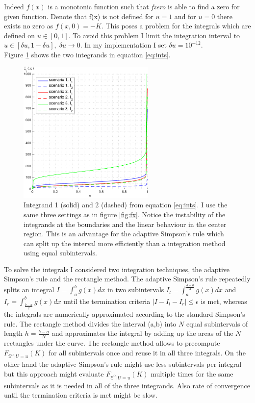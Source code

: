 \documentclass[a4paper]{article}
\begin{document}
Indeed $f(x)$ is a monotonic function such that \textit{fzero} is able to find a zero for given function. Denote that f(x) is not defined for $u=1$ and for $u=0$ there exists no zero as $f(x,0)=-K$. This poses a problem for the integrals which are defined on $u\in[0,1]$. To avoid this problem I limit the integration interval to $u\in[\delta u,1-\delta u],\; \delta u \rightarrow 0.$ In my implementation I set $\delta u = 10^{-12}.$ \\
Figure \ref{fig:ints} shows the two integrands in equation \ref{eq:ints}. 
\begin{figure}[h!]
	\centering
	\captionsetup{width=.6\linewidth}
	\includegraphics[width=0.6\textwidth]{graphics/ints_noTitle.pdf}
	\caption{Integrand 1 (solid) and 2 (dashed) from equation \ref{eq:ints}. I use the same three settings as in figure \ref{fig:fx}. Notice the instability of the integrands at the boundaries and the linear behaviour in the center region. This is an advantage for the adaptive Simpson's rule which can split up the interval more efficiently than a integration method using equal subintervals. }
	\label{fig:ints}
\end{figure}
To solve the integrals I considered two integration techniques, the adaptive Simpson's rule and the rectangle method. The adaptive Simpson's rule repeatedly splits an integral $I = \int_a^b g(x) dx$ in two subintervals $ I_l = \int_a^{\frac{b-a}{2}} g(x) dx$ and $I_r = \int_{\frac{b-a}{2}}^b g(x) dx$ until the termination criteria $|I-I_l-I_r| \leq \epsilon$ is met, whereas the integrals are numerically approximated according to the standard Simpson's rule. The rectangle method divides the interval (a,b) into $N$ equal subintervals of length $h=\frac{b-a}{N}$ and approximates the integral by adding up the areas of the $N$ rectangles under the curve. The rectangle method allows to precompute $F_{\mathbb{S}^{ic}|U=u}(K)$ for all subintervals once and reuse it in all three integrals. On the other hand the adaptive Simpson's rule might use less subintervals per integral but  this approach might evaluate $F_{\mathbb{S}^{ic}|U=u}(K)$ multiple times for the same subintervals as it is needed in all of the three integrands. Also rate of convergence until the termination criteria is met might be slow.\\
\end{document}
